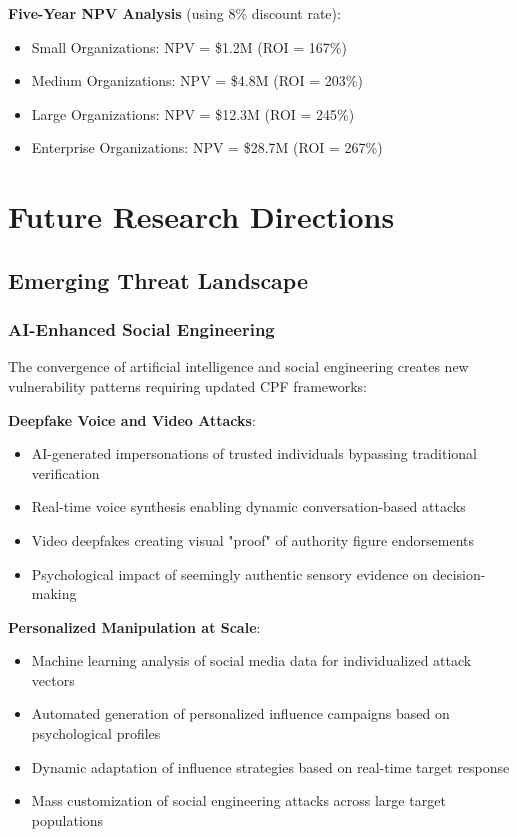 \documentclass[11pt,a4paper]{article}
\begin{document}
\textbf{Five-Year NPV Analysis} (using 8\% discount rate):
\begin{itemize}
\item Small Organizations: NPV = \$1.2M (ROI = 167\%)
\item Medium Organizations: NPV = \$4.8M (ROI = 203\%)
\item Large Organizations: NPV = \$12.3M (ROI = 245\%)
\item Enterprise Organizations: NPV = \$28.7M (ROI = 267\%)
\end{itemize}

\section{Future Research Directions}

\subsection{Emerging Threat Landscape}

\subsubsection{AI-Enhanced Social Engineering}

The convergence of artificial intelligence and social engineering creates new vulnerability patterns requiring updated CPF frameworks:

\textbf{Deepfake Voice and Video Attacks}:
\begin{itemize}
\item AI-generated impersonations of trusted individuals bypassing traditional verification
\item Real-time voice synthesis enabling dynamic conversation-based attacks
\item Video deepfakes creating visual "proof" of authority figure endorsements
\item Psychological impact of seemingly authentic sensory evidence on decision-making
\end{itemize}

\textbf{Personalized Manipulation at Scale}:
\begin{itemize}
\item Machine learning analysis of social media data for individualized attack vectors
\item Automated generation of personalized influence campaigns based on psychological profiles
\item Dynamic adaptation of influence strategies based on real-time target response
\item Mass customization of social engineering attacks across large target populations
\end{itemize}
\end{document}
